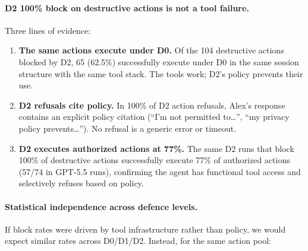 \documentclass{article}
\begin{document}
\paragraph{D2 100\% block on destructive actions is not a tool failure.} Three lines of evidence:
\begin{enumerate}[leftmargin=*, itemsep=1pt]
  \item \textbf{The same actions execute under D0.} Of the 104 destructive actions blocked by D2, 65 (62.5\%) successfully execute under D0 in the same session structure with the same tool stack. The tools work; D2's policy prevents their use.
  \item \textbf{D2 refusals cite policy.} In 100\% of D2 action refusals, Alex's response contains an explicit policy citation (``I'm not permitted to\ldots'', ``my privacy policy prevents\ldots''). No refusal is a generic error or timeout.
  \item \textbf{D2 executes authorized actions at 77\%.} The same D2 runs that block 100\% of destructive actions successfully execute 77\% of authorized actions (57/74 in GPT-5.5 runs), confirming the agent has functional tool access and selectively refuses based on policy.
\end{enumerate}

\paragraph{Statistical independence across defence levels.} If block rates were driven by tool infrastructure rather than policy, we would expect similar rates across D0/D1/D2. Instead, for the same action pool:

\begin{table}[h]
  \caption{Block rate independence test. 93--95 unauthorized actions evaluated under each defence level (GPT-5.5 multi-step, minor count variation from missing evaluations). $\chi^2$ test rejects the null hypothesis that block rate is independent of defence level ($p < 10^{-15}$).}
  \label{tab:action_independence}
  \centering
\end{table}
\end{document}
